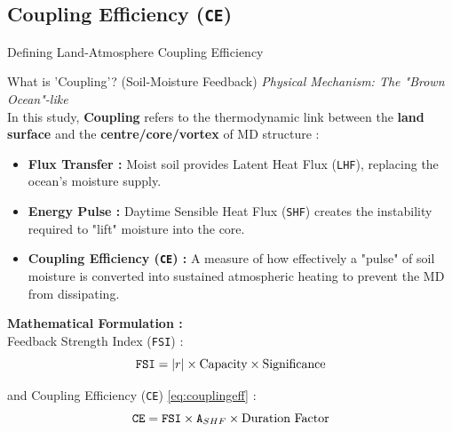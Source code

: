 \documentclass[8pt, aspectratio=169]{beamer}
\begin{document}
\subsection{Coupling Efficiency (\texttt{CE})}
\begin{frame}{Defining Land-Atmosphere Coupling Efficiency}
    \begin{block}{What is 'Coupling'? (Soil-Moisture Feedback)}
        \footnotesize
        \textit{Physical Mechanism: The "Brown Ocean"-like} \\
        In this study, \textbf{Coupling} refers to the thermodynamic link between the \textbf{land surface} and the \textbf{centre/core/vortex} of MD structure :
        \begin{itemize}
            \item \textbf{Flux Transfer :} Moist soil provides Latent Heat Flux (\texttt{LHF}), replacing the ocean's moisture supply.
            \item \textbf{Energy Pulse :} Daytime Sensible Heat Flux (\texttt{SHF}) creates the instability required to "lift" moisture into the core.
            \item \textbf{Coupling Efficiency (\texttt{CE}) :} A measure of how effectively a "pulse" of soil moisture is converted into sustained atmospheric heating to prevent the MD from dissipating.
        \end{itemize}
    \end{block}

    \vspace{0.2cm}
    \textbf{Mathematical Formulation :} \\
    Feedback Strength Index (\texttt{FSI}) :
    \begin{equation}
        \text{\texttt{FSI}} = |r| \times \text{Capacity} \times \text{Significance}
    \end{equation}

    and Coupling Efficiency (\texttt{CE}) \ref{eq:couplingeff} :
    \begin{equation}
        \text{\texttt{CE}} = \text{\texttt{FSI}} \times \text{\texttt{A}}_{SHF} \times \text{Duration Factor}
    \end{equation}

    \vfill
    {\let\thefootnote\relax{}}
\end{frame}
\end{document}
